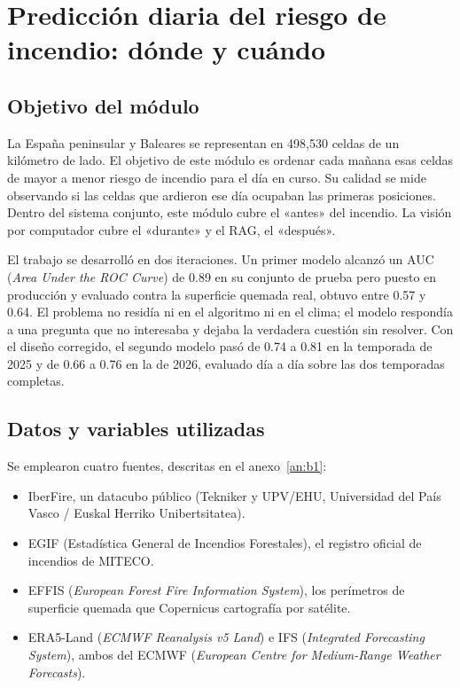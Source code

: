 \documentclass[10pt,a4paper]{article}
\begin{document}
\section*{Predicción diaria del riesgo de incendio: dónde y cuándo}
\label{sec:ml}

\subsection{Objetivo del módulo}

La España peninsular y Baleares se representan en 498,530 celdas de un
kilómetro de lado. El objetivo de este módulo es ordenar cada mañana esas
celdas de mayor a menor riesgo de incendio para el día en curso. Su calidad se
mide observando si las celdas que ardieron ese día ocupaban las primeras
posiciones. Dentro del sistema conjunto, este módulo cubre el «antes» del
incendio. La visión por computador cubre el «durante» y el RAG, el «después».

El trabajo se desarrolló en dos iteraciones. Un primer modelo alcanzó un AUC
(\emph{Area Under the ROC Curve}) de 0.89 en su conjunto de prueba pero puesto
en producción y evaluado contra la superficie quemada real, obtuvo entre 0.57 y
0.64. El problema no residía ni en el algoritmo ni en el clima; el modelo
respondía a una pregunta que no interesaba y dejaba la verdadera cuestión sin
resolver. Con el diseño corregido, el segundo modelo pasó de 0.74 a 0.81 en la
temporada de 2025 y de 0.66 a 0.76 en la de 2026, evaluado día a día sobre las
dos temporadas completas.

\subsection{Datos y variables utilizadas}

Se emplearon cuatro fuentes, descritas en el anexo~\ref{an:b1}:

\begin{itemize}
  \item IberFire, un datacubo público (Tekniker y UPV/EHU, Universidad del
  País Vasco / Euskal Herriko Unibertsitatea).
  \item EGIF (Estadística General de Incendios Forestales), el registro oficial
  de incendios de MITECO.
  \item EFFIS (\emph{European Forest Fire Information System}), los perímetros
  de superficie quemada que Copernicus cartografía por satélite.
  \item ERA5-Land (\emph{ECMWF Reanalysis v5 Land}) e IFS (\emph{Integrated
  Forecasting System}), ambos del ECMWF (\emph{European Centre for
  Medium-Range Weather Forecasts}).
\end{itemize}
\end{document}
